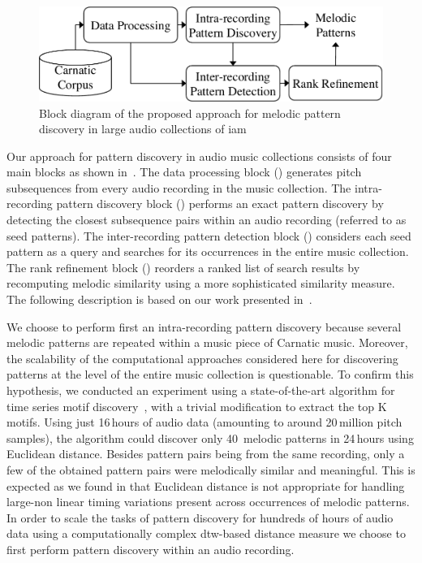 \begin{figure}
	\begin{center}
		\includegraphics[width=\figSizeEightyFive]{ch06_patterns/figures/discovery/blockDiagram_Overall.pdf}
	\end{center}
	\caption{Block diagram of the proposed approach for melodic pattern discovery in large audio collections of \gls{iam}}
	\label{fig:pattern_discovery_overall_block_diagram}
\end{figure}

Our approach for pattern discovery in audio music collections consists of four main blocks as shown in~. The data processing block () generates pitch subsequences from every audio recording in the music collection. The intra-recording pattern discovery block () performs an exact pattern discovery by detecting the closest subsequence pairs within an audio recording (referred to as seed patterns). The inter-recording pattern detection block () considers each seed pattern as a query and searches for its occurrences in the entire music collection. The rank refinement block () reorders a ranked list of search results by recomputing melodic similarity using a more sophisticated similarity measure. The following description is based on our work presented in~\cite{gulati_SITIS_2014}.

We choose to perform first an intra-recording pattern discovery because several melodic patterns are repeated within a music piece of Carnatic music. Moreover, the scalability of the computational approaches considered here for discovering patterns at the level of the entire music collection is questionable. To confirm this hypothesis, we conducted an experiment using a state-of-the-art algorithm for time series motif discovery~\citep{Mueen2009}, with a trivial modification to extract the top K motifs. Using just 16\,hours of audio data (amounting to around 20\,million pitch samples), the algorithm could discover only 40~melodic patterns in 24\,hours using Euclidean distance. Besides pattern pairs being from the same recording, only a few of the obtained pattern pairs were melodically similar and meaningful. This is expected as we found in  that Euclidean distance is not appropriate for handling large-non linear timing variations present across occurrences of melodic patterns. In order to scale the tasks of pattern discovery for hundreds of hours of audio data using a computationally complex \gls{dtw}-based distance measure we choose to first perform pattern discovery within an audio recording.


